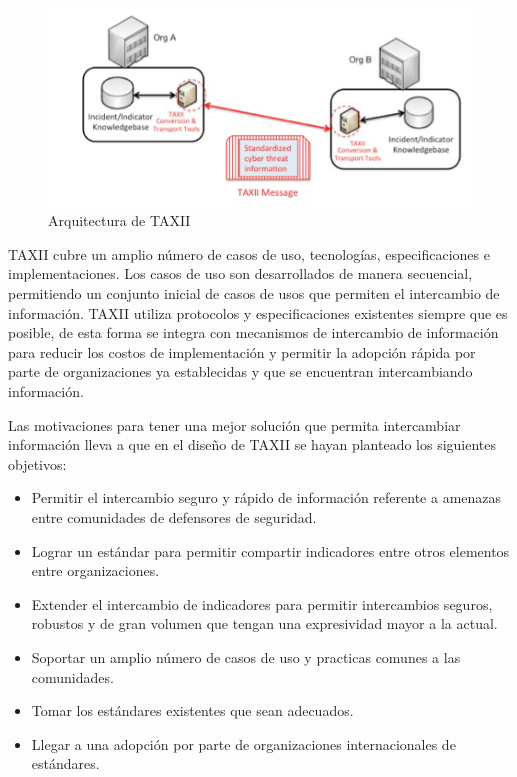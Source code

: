  
\begin{figure}[ht!]
  \centering
    \includegraphics[width=150mm]{./images/TAXIIArchitecture1.png}
    \caption{Arquitectura de TAXII \protect\cite{b1}}
\end{figure}


TAXII cubre un amplio número de casos de uso, tecnologías, especificaciones e 
implementaciones. Los casos de uso son desarrollados de manera secuencial, 
permitiendo un conjunto inicial de casos de usos que permiten el intercambio de 
información. TAXII utiliza protocolos y especificaciones existentes siempre que 
es posible, de esta forma se integra con mecanismos de intercambio de 
información para reducir los costos de implementación y permitir la adopción 
rápida por parte de organizaciones ya establecidas y que se encuentran 
intercambiando información.

Las motivaciones para tener una mejor solución que permita intercambiar 
información lleva a que en el diseño de TAXII se hayan planteado los siguientes 
objetivos:
 \begin{itemize}
   \item Permitir el intercambio seguro y rápido de información referente a 
   amenazas entre comunidades de defensores de seguridad.
   \item Lograr un estándar para permitir compartir indicadores entre otros 
   elementos entre organizaciones.
   \item Extender el intercambio de indicadores para permitir intercambios 
   seguros, robustos y de gran volumen que tengan una expresividad mayor a la 
   actual.
   \item Soportar un amplio número de casos de uso y practicas comunes a las 
   comunidades.
   \item Tomar los estándares existentes que sean adecuados.
   \item Llegar a una adopción por parte de organizaciones internacionales de 
   estándares.
 \end{itemize}

